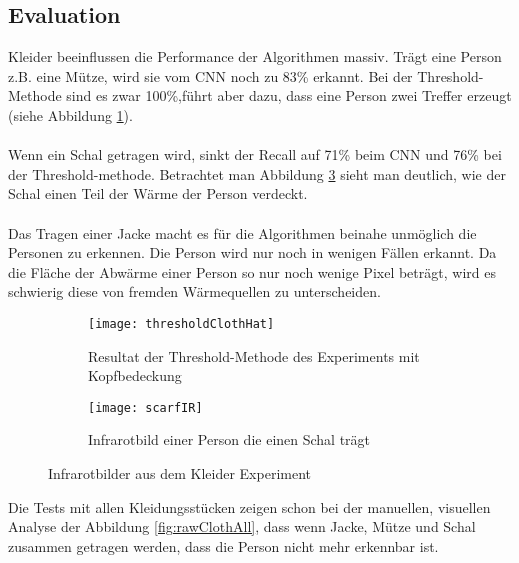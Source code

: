 \subsection{Evaluation}
Kleider beeinflussen die Performance der Algorithmen massiv. Trägt eine Person z.B. eine Mütze, wird sie vom \gls{CNN} noch zu 83\% erkannt. Bei der Threshold-Methode sind es zwar 100\%,führt aber dazu, dass eine Person zwei Treffer erzeugt (siehe Abbildung \ref{fig:thresholdClothHat}).\\
\\
Wenn ein Schal getragen wird, sinkt der Recall auf 71\% beim \gls{CNN} und 76\% bei der Threshold-methode. Betrachtet man Abbildung \ref{fig:scarfIR} sieht man deutlich, wie der Schal einen Teil der Wärme der Person verdeckt.\\
\\
Das Tragen einer Jacke macht es für die Algorithmen beinahe unmöglich die Personen zu erkennen. Die Person wird nur noch in wenigen Fällen erkannt. Da die Fläche der Abwärme einer Person so nur noch wenige Pixel beträgt, wird es schwierig diese von fremden Wärmequellen zu unterscheiden.\\

\begin{figure}[H]
	\centering
	\begin{subfigure}{.45\linewidth}
		\centering
		\texttt{[image: thresholdClothHat]}
		\caption{Resultat der Threshold-Methode des Experiments mit Kopfbedeckung}
		\label{fig:thresholdClothHat}
	\end{subfigure}\hfill%
	\begin{subfigure}{.45\linewidth}
		\centering
		\texttt{[image: scarfIR]}
		\caption{Infrarotbild einer Person die einen Schal trägt}
		\label{fig:scarfIR}
	\end{subfigure}\hfill%
	\caption{Infrarotbilder aus dem Kleider Experiment}
\end{figure}

\noindent
Die Tests mit allen Kleidungsstücken zeigen schon bei der manuellen, visuellen Analyse der Abbildung \ref{fig:rawClothAll}, dass wenn Jacke, Mütze und Schal zusammen getragen werden, dass die Person nicht mehr erkennbar ist.

